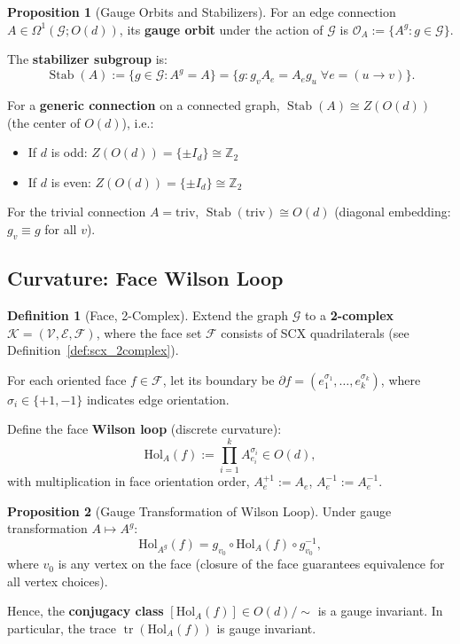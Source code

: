 \documentclass[12pt,a4paper]{article}
\theoremstyle{definition}
\newtheorem{definition}{Definition}[section]
\newtheorem{proposition}{Proposition}[section]
\theoremstyle{remark}
\theoremstyle{definition}
\newcommand{\Z}{\mathbb{Z}}
\newcommand{\Od}{O(d)}
\newcommand{\grph}{\mathcal{G}}
\newcommand{\verts}{\mathcal{V}}
\newcommand{\edgs}{\mathcal{E}}
\newcommand{\faces}{\mathcal{F}}
\newcommand{\face}{\ensuremath{\mathit{f}}}
\newcommand{\Hol}{\mathrm{Hol}}
\newcommand{\triv}{\mathrm{triv}}
\DeclareMathOperator{\tr}{tr}
\DeclareMathOperator{\Stab}{Stab}
\begin{document}
\begin{proposition}[Gauge Orbits and Stabilizers]\label{prop:od_stabilizer}
For an edge connection $A \in \Omega^1(\grph; \Od)$, its \textbf{gauge orbit} under the action of $\mathcal{G}$ is $\mathcal{O}_A := \{A^g : g \in \mathcal{G}\}$.

The \textbf{stabilizer subgroup} is:
\[
    \Stab(A) := \{g \in \mathcal{G} : A^g = A\} = \{g: g_v A_e = A_e g_u \; \forall e = (u \to v)\}.
\]

For a \textbf{generic connection} on a connected graph, $\Stab(A) \cong Z(\Od)$ (the center of $\Od$), i.e.:
\begin{itemize}
    \item If $d$ is odd: $Z(\Od) = \{\pm I_d\} \cong \Z_2$
    \item If $d$ is even: $Z(\Od) = \{\pm I_d\} \cong \Z_2$
\end{itemize}

For the trivial connection $A = \triv$, $\Stab(\triv) \cong \Od$ (diagonal embedding: $g_v \equiv g$ for all $v$).
\end{proposition}

\subsection{Curvature: Face Wilson Loop}

\begin{definition}[Face, 2-Complex]\label{def:2complex_od}
Extend the graph $\grph$ to a \textbf{2-complex} $\mathcal{K} = (\verts, \edgs, \faces)$,
where the face set $\faces$ consists of SCX quadrilaterals (see Definition~\ref{def:scx_2complex}).

For each oriented face $\face \in \faces$, let its boundary be $\partial \face = (e_1^{\sigma_1}, \dots, e_k^{\sigma_k})$,
where $\sigma_i \in \{+1, -1\}$ indicates edge orientation.

Define the face \textbf{Wilson loop} (discrete curvature):
\[
    \Hol_A(\face) := \prod_{i=1}^{k} A_{e_i}^{\sigma_i} \in \Od,
\]
with multiplication in face orientation order, $A_e^{+1} := A_e$, $A_e^{-1} := A_e^{-1}$.
\end{definition}

\begin{proposition}[Gauge Transformation of Wilson Loop]\label{prop:wilson_gauge_od}
Under gauge transformation $A \mapsto A^g$:
\[
    \Hol_{A^g}(\face) = g_{v_0} \circ \Hol_A(\face) \circ g_{v_0}^{-1},
\]
where $v_0$ is any vertex on the face (closure of the face guarantees equivalence for all vertex choices).

Hence, the \textbf{conjugacy class} $[\Hol_A(\face)] \in \Od/{\sim}$ is a gauge invariant.
In particular, the trace $\tr(\Hol_A(\face))$ is gauge invariant.
\end{proposition}
\end{document}
